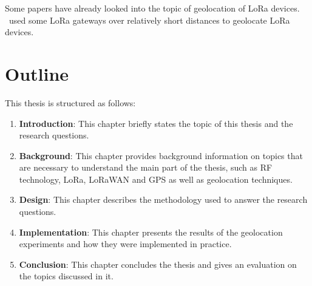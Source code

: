 Some papers have already looked into the topic of geolocation of \ac{LoRa} devices.
\cite{mackey_lora-based_2019}~used some \ac{LoRa} gateways over relatively short distances to geolocate \ac{LoRa} devices.

\section{Outline}

This thesis is structured as follows:

\begin{enumerate}
    \item \textbf{Introduction}:
          This chapter briefly states the topic of this thesis and the research questions.
    \item \textbf{Background}:
          This chapter provides background information on topics that are necessary to understand the main part of the thesis, such as \ac{RF} technology, \ac{LoRa}, \ac{LoRaWAN} and \ac{GPS} as well as geolocation techniques.
    \item \textbf{Design}:
          This chapter describes the methodology used to answer the research questions.
    \item \textbf{Implementation}:
          This chapter presents the results of the geolocation experiments and how they were implemented in practice.
    \item \textbf{Conclusion}:
          This chapter concludes the thesis and gives an evaluation on the topics discussed in it.
\end{enumerate}